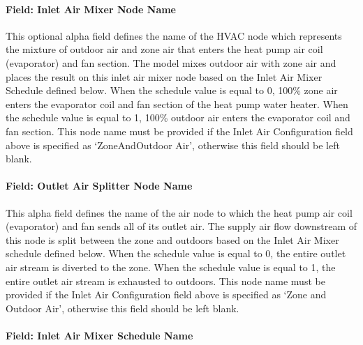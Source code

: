 \paragraph{Field: Inlet Air Mixer Node Name}\label{field-inlet-air-mixer-node-name}

This optional alpha field defines the name of the HVAC node which represents the mixture of outdoor air and zone air that enters the heat pump air coil (evaporator) and fan section. The model mixes outdoor air with zone air and places the result on this inlet air mixer node based on the Inlet Air Mixer Schedule defined below. When the schedule value is equal to 0, 100\% zone air enters the evaporator coil and fan section of the heat pump water heater. When the schedule value is equal to 1, 100\% outdoor air enters the evaporator coil and fan section. This node name must be provided if the Inlet Air Configuration field above is specified as `ZoneAndOutdoor Air', otherwise this field should be left blank.

\paragraph{Field: Outlet Air Splitter Node Name}\label{field-outlet-air-splitter-node-name}

This alpha field defines the name of the air node to which the heat pump air coil (evaporator) and fan sends all of its outlet air. The supply air flow downstream of this node is split between the zone and outdoors based on the Inlet Air Mixer schedule defined below. When the schedule value is equal to 0, the entire outlet air stream is diverted to the zone. When the schedule value is equal to 1, the entire outlet air stream is exhausted to outdoors. This node name must be provided if the Inlet Air Configuration field above is specified as `Zone and Outdoor Air', otherwise this field should be left blank.

\paragraph{Field: Inlet Air Mixer Schedule Name}\label{field-inlet-air-mixer-schedule-name}


